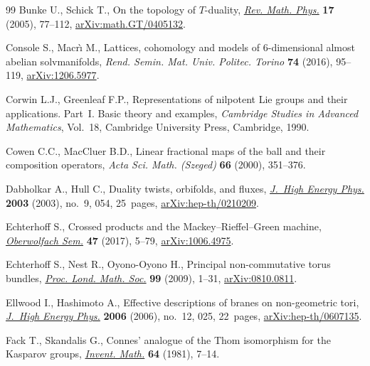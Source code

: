 \documentclass[pdftex]{sigma}
\numberwithin{equation}{section}
\begin{document}
\begin{thebibliography}{99}
Bunke U., Schick T., On the topology of {$T$}-duality, \href{https://doi.org/10.1142/S0129055X05002315}{\textit{Rev. Math.
 Phys.}} \textbf{17} (2005), 77--112, \href{https://arxiv.org/abs/math.GT/0405132}{arXiv:math.GT/0405132}.

Console S., Macr\`{\i} M., Lattices, cohomology and models of 6-dimensional
 almost abelian solvmanifolds, \textit{Rend. Semin. Mat. Univ. Politec.
 Torino} \textbf{74} (2016), 95--119, \href{https://arxiv.org/abs/1206.5977}{arXiv:1206.5977}.

Corwin L.J., Greenleaf F.P., Representations of nilpotent {L}ie groups and
 their applications. {P}art~{I}. Basic theory and examples, \textit{Cambridge
 Studies in Advanced Mathematics}, Vol.~18, Cambridge University Press,
 Cambridge, 1990.

Cowen C.C., MacCluer B.D., Linear fractional maps of the ball and their
 composition operators, \textit{Acta Sci. Math. (Szeged)} \textbf{66} (2000),
 351--376.

Dabholkar A., Hull C., Duality twists, orbifolds, and fluxes, \href{https://doi.org/10.1088/1126-6708/2003/09/054}{\textit{J.~High
 Energy Phys.}} \textbf{2003} (2003), no.~9, 054, 25~pages,
 \href{https://arxiv.org/abs/hep-th/0210209}{arXiv:hep-th/0210209}.

Echterhoff S., Crossed products and the Mackey--Rieffel--Green machine,
 \href{https://doi.org/10.1088/1126-6708/2003/09/054}{\textit{Oberwolfach Sem.}} \textbf{47} (2017), 5--79, \href{https://arxiv.org/abs/1006.4975}{arXiv:1006.4975}.

Echterhoff S., Nest R., Oyono-Oyono H., Principal non-commutative torus
 bundles, \href{https://doi.org/10.1112/plms/pdn050}{\textit{Proc. Lond. Math. Soc.}} \textbf{99} (2009), 1--31,
 \href{https://arxiv.org/abs/#2}{arXiv:0810.0811}.

Ellwood I., Hashimoto A., Effective descriptions of branes on non-geometric
 tori, \href{https://doi.org/10.1088/1126-6708/2006/12/025}{\textit{J.~High Energy Phys.}} \textbf{2006} (2006), no.~12, 025,
 22~pages, \href{https://arxiv.org/abs/hep-th/0607135}{arXiv:hep-th/0607135}.

Fack T., Skandalis G., Connes' analogue of the {T}hom isomorphism for the
 {K}asparov groups, \href{https://doi.org/10.1007/BF01393931}{\textit{Invent. Math.}} \textbf{64} (1981), 7--14.


\end{thebibliography}
\end{document}
